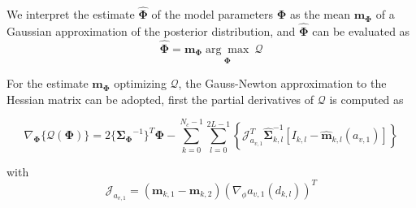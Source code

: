 We interpret the estimate $\hat{\mathbf{\Phi}}$ of the model
parameters $\mathbf{\Phi}$ as  the mean $\mathbf{m}_{\mathbf{\Phi}}$ of a Gaussian
approximation of the posterior distribution, and $\hat{\mathbf{\Phi}}$ can be evaluated as 
\begin{equation}
  \label{eq:5.23}
  \hat{\mathbf{\Phi}} = \mathbf{m}_{\mathbf{\Phi}}\underset{\mathbf{\Phi}}{\arg\max} \ \mathcal{Q}
\end{equation}

For the estimate $\mathbf{m}_{\mathbf{\Phi}}$ optimizing
$\mathcal{Q}$, the Gauss-Newton approximation to
the Hessian matrix can be adopted, first the partial derivatives of
$\mathcal{Q}$ is computed as 

\begin{equation}
\label{eq:5.24}
\nabla_{\mathbf{\Phi}}\{{\mathcal{Q}(\mathbf{\Phi})}\} =  2\{{\mathbf{\Sigma}_{\mathbf{\Phi}}}^{-1}\}^{T}{\mathbf{\Phi}} - \sum_{k = 0}^{N_{c}-1} \sum_{l=0}^{2L-1}
\left\{\mathcal{J}_{a_{v,1}}^T\hat{\mathbf{\Sigma}}_{k,l}^{-1}\left[I_{k,l}-\hat{\mathbf{m}}_{k,l}(a_{v,1})\right]\right\}
\end{equation}

with 
\begin{equation}
  \label{eq:5.25}
  \mathcal{J}_{a_{v,1}} = \left( \mathbf{m}_{k,1} -\mathbf{m}_{k,2} \right)(\nabla_{\phi} a_{v,1}(d_{k,l}))^T
\end{equation}

